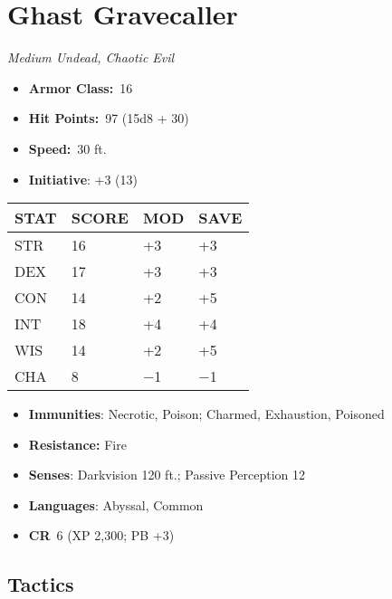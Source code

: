 \documentclass[10pt,twocolumn]{article}
\let\oldtextbf\textbf
\renewcommand{\textbf}[1]{\oldtextbf{{#1}}}
\providecommand{\tightlist}{
  \setlength{\itemsep}{4pt}
  \setlength{\topsep}{0pt}
  \setlength{\parsep}{0pt}
  \setlength{\parskip}{0pt}
  \setlength{\partopsep}{0pt}
}
\begin{document}
\section{Ghast Gravecaller}\label{ghast-gravecaller}

\emph{Medium Undead, Chaotic Evil}

\setlength{\itemsep}{0pt}

\begin{itemize}
\tightlist
\item
  \textbf{Armor Class:}~16
\item
  \textbf{Hit Points:}~97 (15d8 + 30)
\item
  \textbf{Speed:}~30 ft.
\item
  \textbf{Initiative}: +3 (13)
\end{itemize}

\begin{center}
{\sffamily\fontsize{8pt}{8pt}\selectfont
{}
\begin{tabular}{llll}
\toprule
\textbf{STAT} & \textbf{SCORE} & \textbf{MOD} & \textbf{SAVE} \\
\midrule
STR & 16 & +3 & +3 \\
DEX & 17 & +3 & +3 \\
CON & 14 & +2 & +5 \\
INT & 18 & +4 & +4 \\
WIS & 14 & +2 & +5 \\
CHA & 8 & −1 & −1 \\
\bottomrule
\end{tabular}}
\end{center}

\setlength{\itemsep}{0pt}

\begin{itemize}
\tightlist
\item
  \textbf{Immunities}: Necrotic, Poison; Charmed, Exhaustion, Poisoned
\item
  \textbf{Resistance:} Fire
\item
  \textbf{Senses}: Darkvision 120 ft.; Passive Perception 12
\item
  \textbf{Languages}: Abyssal, Common
\item
  \textbf{CR}~6 (XP 2,300; PB +3)
\end{itemize}

\subsection{Tactics}\label{tactics-2}
\end{document}
